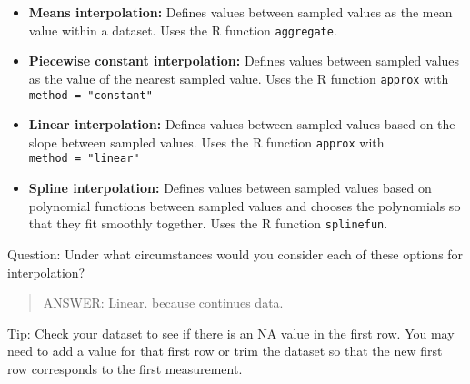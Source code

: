 \documentclass[]{article}
\begin{document}
\begin{itemize}
\item
  \textbf{Means interpolation:} Defines values between sampled values as
  the mean value within a dataset. Uses the R function
  \texttt{aggregate}.
\item
  \textbf{Piecewise constant interpolation:} Defines values between
  sampled values as the value of the nearest sampled value. Uses the R
  function \texttt{approx} with \texttt{method\ =\ "constant"}
\item
  \textbf{Linear interpolation:} Defines values between sampled values
  based on the slope between sampled values. Uses the R function
  \texttt{approx} with \texttt{method\ =\ "linear"}
\item
  \textbf{Spline interpolation:} Defines values between sampled values
  based on polynomial functions between sampled values and chooses the
  polynomials so that they fit smoothly together. Uses the R function
  \texttt{splinefun}.
\end{itemize}

Question: Under what circumstances would you consider each of these
options for interpolation?

\begin{quote}
ANSWER: Linear. because continues data.
\end{quote}

Tip: Check your dataset to see if there is an NA value in the first row.
You may need to add a value for that first row or trim the dataset so
that the new first row corresponds to the first measurement.
\end{document}
